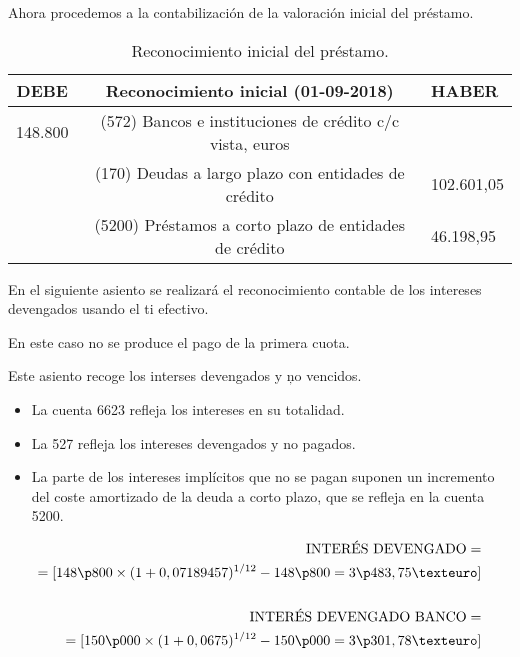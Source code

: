Ahora procedemos a la contabilización de la valoración inicial del préstamo.

\begin{table}[H]
    \centering
    \begin{tabular}{|c|c|p{2cm}|}
        \hline
        \rowcolor{blue!30}
        \textbf{DEBE} & \textbf{Reconocimiento inicial (01-09-2018)} & \textbf{HABER} \\
        \hline
        148.800 & (572) Bancos e instituciones de crédito c/c vista, euros & \\
        \hline
        & (170) Deudas a largo plazo con entidades de crédito & 102.601,05 \\
        \hline
        & (5200) Préstamos a corto plazo de entidades de crédito & 46.198,95 \\
        \hline
    \end{tabular}
    \caption{Reconocimiento inicial del préstamo.}
    \label{tabla:reconocimiento_inicial}
\end{table}

En el siguiente asiento se realizará el reconocimiento contable de los intereses devengados usando el ti efectivo.

En este caso no se produce el pago de la primera cuota.

Este asiento recoge los interses devengados y \c{no vencidos}.

\begin{itemize}
    \item La cuenta 6623 refleja los intereses en su totalidad.
    \item La 527 refleja los intereses devengados y no pagados.
    \item La parte de los intereses implícitos que no se pagan suponen un incremento del coste amortizado de la deuda a corto plazo, que se refleja en la cuenta 5200.
\end{itemize}

\begin{align*}
    \text{INTERÉS DEVENGADO} = \\ = [148\p800 \times (1 + 0,07189457)^{1/12} - 148\p800 = 3\p483,75 €] \\
    \\ 
    \text{INTERÉS DEVENGADO BANCO} = \\ = [150\p000 \times (1 + 0,0675)^{1/12} - 150\p000 = 3\p301,78 €]
\end{align*}

